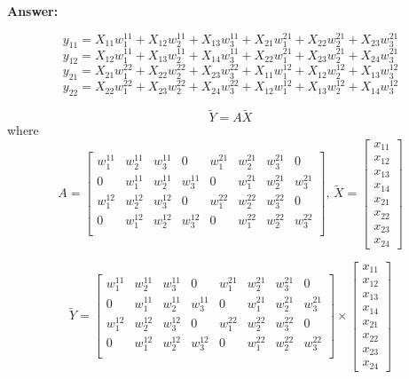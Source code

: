 \documentclass[11pt]{article}
\begin{document}
\begin{enumerate}
\begin{enumerate}
    \textbf{Answer: }

    \[
    y_{11} = X_{11}w_1^{11} + X_{12}w_2^{11} + X_{13}w_3^{11} +  
             X_{21}w_1^{21} + X_{22}w_2^{21} + X_{23}w_3^{21}     
    \]
    \[
    y_{12} = X_{12}w_1^{11} + X_{13}w_2^{11} + X_{14}w_3^{11} +  
             X_{22}w_1^{21} + X_{23}w_2^{21} + X_{24}w_3^{21}     
    \]
    \[
    y_{21} = X_{21}w_1^{22} + X_{22}w_2^{22} + X_{23}w_3^{22} +  
             X_{11}w_1^{12} + X_{12}w_2^{12} + X_{13}w_3^{12}     
    \]
    \[
    y_{22} = X_{22}w_1^{22} + X_{23}w_2^{22} + X_{24}w_3^{22} +  
             X_{12}w_1^{12} + X_{13}w_2^{12} + X_{14}w_3^{12}     
    \]
         
         \[\tilde Y = A \tilde X\] 
         where   
        \[A=\begin{bmatrix}
            w_1^{11}&w_2^{11}&w_3^{11}&0&w_1^{21}&w_2^{21}&w_3^{21}&0\\
            0&w_1^{11}&w_2^{11}&w_3^{11}&0&w_1^{21}&w_2^{21}&w_3^{21}\\
            w_1^{12}&w_2^{12}&w_3^{12}&0&w_1^{22}&w_2^{22}&w_3^{22}&0\\
            0&w_1^{12}&w_2^{12}&w_3^{12}&0&w_1^{22}&w_2^{22}&w_3^{22}\\
        \end{bmatrix} \text{, } \tilde X = \begin{bmatrix}
            x_{11}\\x_{12}\\x_{13}\\x_{14}\\x_{21}\\x_{22}\\x_{23}\\x_{24}
        \end{bmatrix}\]

        \[\tilde Y = \begin{bmatrix}
            w_1^{11}&w_2^{11}&w_3^{11}&0&w_1^{21}&w_2^{21}&w_3^{21}&0\\
            0&w_1^{11}&w_2^{11}&w_3^{11}&0&w_1^{21}&w_2^{21}&w_3^{21}\\
            w_1^{12}&w_2^{12}&w_3^{12}&0&w_1^{22}&w_2^{22}&w_3^{22}&0\\
            0&w_1^{12}&w_2^{12}&w_3^{12}&0&w_1^{22}&w_2^{22}&w_3^{22}\\
        \end{bmatrix} \times \begin{bmatrix}
            x_{11}\\x_{12}\\x_{13}\\x_{14}\\x_{21}\\x_{22}\\x_{23}\\x_{24}
        \end{bmatrix}\]




\end{enumerate}
\end{enumerate}
\end{document}

